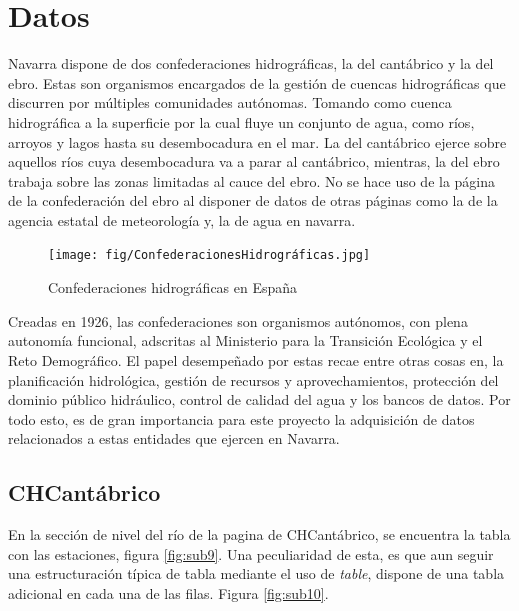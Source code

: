 \chapter[Datos]{Datos}
\label{Chap2}

Navarra dispone de dos confederaciones hidrográficas, la del cantábrico y la del ebro. Estas son organismos encargados de la gestión de cuencas hidrográficas que discurren por múltiples comunidades autónomas. Tomando como cuenca hidrográfica a la superficie por la cual fluye un conjunto de agua, como ríos, arroyos y lagos hasta su desembocadura en el mar.\newline
\newline
La del cantábrico ejerce sobre aquellos ríos cuya desembocadura va a parar al cantábrico, mientras, la del ebro trabaja sobre las zonas limitadas al cauce del ebro.\newline
\newline
No se hace uso de la página de la confederación del ebro al disponer de datos de otras páginas como la de la agencia estatal de meteorología y, la de agua en navarra. 

\begin{figure} [H]
	\centering
	\texttt{[image: fig/ConfederacionesHidrográficas.jpg]}
	\caption[Confederaciones hidrográficas en España]{Confederaciones hidrográficas en España}
	\label{fig:ej32}
\end{figure}

Creadas en 1926, las confederaciones son organismos autónomos, con plena autonomía funcional, adscritas al Ministerio para la Transición Ecológica y el Reto Demográfico. El papel desempeñado por estas recae entre otras cosas en, la planificación hidrológica, gestión de recursos y aprovechamientos, protección del dominio público hidráulico, control de calidad del agua y los bancos de datos.\newline
\newline
Por todo esto, es de gran importancia para este proyecto la adquisición de datos relacionados a estas entidades que ejercen en Navarra.

\section{CHCantábrico}
En la sección de nivel del río de la pagina de CHCantábrico, se encuentra la tabla con las estaciones, figura \ref{fig:sub9}. Una peculiaridad de esta, es que aun seguir una estructuración típica de tabla mediante el uso de \textit{table}, dispone de una tabla adicional en cada una de las filas. Figura \ref{fig:sub10}.

